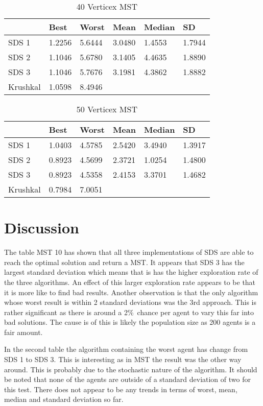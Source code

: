 \documentclass{AISB2008}
\begin{document}
{\begin{table}
\centering
\caption{40 Verticex MST}
\begin{tabular}{l|lllll}
	 	  & Best    & Worst    &   Mean  & Median & SD \\ \hline
SDS 1 & 1.2256	 & 5.6444  & 3.0480 & 1.4553 & 1.7944 \\
SDS 2 & 1.1046	 & 5.6780	& 3.1405 & 4.4635 & 1.8890 \\	
SDS 3 & 1.1046	 & 5.7676	& 3.1981 & 4.3862 & 1.8882 \\	
Krushkal      & 1.0598	 & 8.4946 \\
\end{tabular}
\end{table}

\begin{table}[]
\centering
\caption{50 Verticex MST}
\begin{tabular}{l|lllll}
	   & Best    & Worst    &   Mean  & Median & SD \\ \hline
SDS 1 &  1.0403 & 4.5785	& 2.5420	& 3.4940	& 1.3917 \\
SDS 2 & 0.8923	 & 4.5699	& 2.3721	& 1.0254	& 1.4800 \\	
SDS 3 & 0.8923	 & 4.5358	& 2.4153	& 3.3701	& 1.4682 \\	
Krushkal &	0.7984 &	7.0051 \\
\end{tabular}
\end{table}



\section{Discussion}

The table MST 10 has shown that all three implementations of SDS are able to reach the optimal solution and return a MST. It appears that SDS 3 has the largest standard deviation which means that is has the higher exploration rate of the three algorithms. An effect of this larger exploration rate appears to be that it is more like to find bad results. Another observation is that the only algorithm whose worst result is within 2 standard deviations was the 3rd approach. This is rather significant as there is around a 2\%\ chance per agent to vary this far into bad solutions. The cause is of this is likely the population size as 200 agents is a fair amount.

In the second table the algorithm containing the worst agent has change from SDS 1 to SDS 3. This is interesting as in MST the result was the other way around. This is probably due to the stochastic nature of the algorithm. It should be noted that none of the agents are outside of a standard deviation of two for this test. There does not appear to be any trends in terms of worst, mean, median and standard deviation so far.

}
\end{document}
